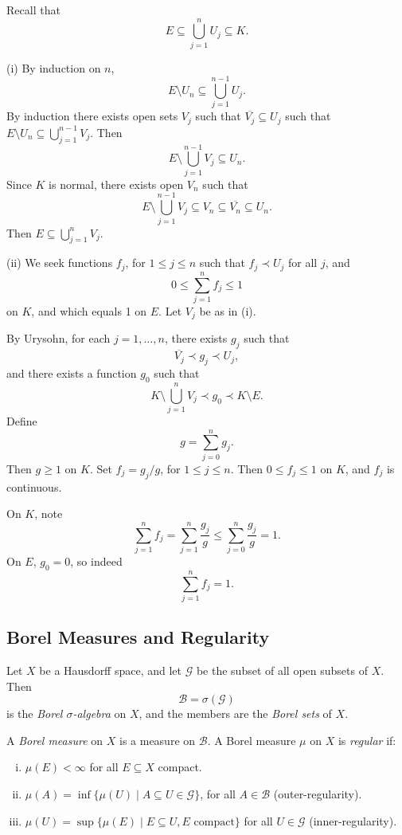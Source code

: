 \documentclass[12pt]{article}
\begin{document}
\begin{proofbox}
	Recall that
	\[
	E \subseteq \bigcup_{j = 1}^n U_j \subseteq K.
	\]
	
	(i) By induction on $n$,
	\[
		E \setminus U_n \subseteq \bigcup_{j = 1}^{n-1} U_j.
	\]
	By induction there exists open sets $V_j$ such that $\overline{V_j} \subseteq U_j$ such that $E \setminus U_n \subseteq \bigcup_{j=1}^{n-1} V_j$. Then
	\[
	E \setminus \bigcup_{j = 1}^{n-1} V_j \subseteq U_n.
	\]
	Since $K$ is normal, there exists open $V_n$ such that
	\[
	E \setminus \bigcup_{j = 1}^{n-1} V_j \subseteq V_n \subseteq \overline{V_n} \subseteq U_n.
	\]
	Then $E \subseteq \bigcup_{j = 1}^n V_j$.

	(ii) We seek functions $f_j$, for $1 \leq j \leq n$ such that $f_j \prec U_j$ for all $j$, and
	\[
	0 \leq \sum_{j = 1}^n f_j \leq 1
	\]
	on $K$, and which equals 1 on $E$. Let $V_j$ be as in (i).

	By Urysohn, for each $j = 1, \ldots, n$, there exists $g_j$ such that
	\[
	\overline{V_j} \prec g_j \prec U_j,
	\]
	and there exists a function $g_0$ such that
	\[
	K \setminus \bigcup_{j = 1}^n V_j \prec g_0 \prec K \setminus E.
	\]
	Define
	\[
	g = \sum_{j = 0}^n g_j.
	\]
	Then $g \geq 1$ on $K$. Set $f_j = g_j/g$, for $1 \leq j \leq n$. Then $0 \leq f_j \leq 1$ on $K$, and $f_j$ is continuous.

	On $K$, note
	\[
	\sum_{j = 1}^n f_j = \sum_{j = 1}^n \frac{g_j}{g} \leq \sum_{j = 0}^n \frac{g_j}{g} = 1.
	\]
	On $E$, $g_0 = 0$, so indeed
	\[
	\sum_{j=1}^n f_j = 1.
	\]
\end{proofbox}

\subsection{Borel Measures and Regularity}%
\label{sub:bmr}

Let $X$ be a Hausdorff space, and let $\mathcal{G}$ be the subset of all open subsets of $X$. Then
\[
\mathcal{B} = \sigma(\mathcal{G})
\]
is the \emph{Borel $\sigma$-algebra} on $X$, and the members are the \emph{Borel sets} of $X$.

A \emph{Borel measure} on $X$ is a measure on $\mathcal{B}$. A Borel measure $\mu$ on $X$ is \emph{regular} if:
\begin{enumerate}[(i)]
	\item $\mu(E) < \infty$ for all $E \subseteq X$ compact.
	\item $\mu(A) = \inf\{\mu(U) \mid A \subseteq U \in \mathcal{G}\}$, for all $A \in \mathcal{B}$ (outer-regularity).
	\item $\mu(U) = \sup\{\mu(E) \mid E \subseteq U, E \text{ compact}\}$ for all $U \in \mathcal{G}$ (inner-regularity).
\end{enumerate}
\end{document}
